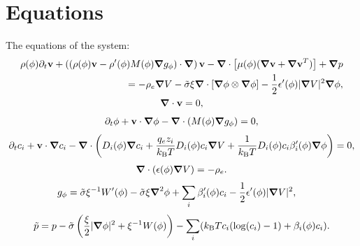 \documentclass[a4paper,10pt]{article}
\renewcommand{\v}[1]{\mathbf{#1}}
\renewcommand{\v}[1]{\ensuremath{\mathbf{#1}}} %
\newcommand{\gv}[1]{\ensuremath{\mbox{\boldmath$ #1 $}}}
\newcommand{\grad}[1]{\gv{\nabla} #1} %
\renewcommand{\div}[1]{\gv{\nabla} \cdot #1} %
\newcommand{\laplacian}[1]{\grad^2 #1}
\newcommand{\pdt}[1]{\partial_t #1}
\begin{document}
\section{Equations}
The equations of the system:
\begin{gather}
\begin{split}
\rho(\phi) \pdt \v v + \left( \left(\rho(\phi) \v v - \rho'(\phi) M(\phi) \grad g_\phi  \right) \cdot \grad \right) \v v - \div \left[  \mu(\phi)(\grad \v v + \grad \v v ^T) \right] + \grad p \\
= - \rho_e \grad V - \tilde \sigma \xi\div \left[ \grad \phi \otimes \grad \phi \right] - \frac 1 2 \epsilon'(\phi) | \grad V |^2 \grad \phi,
\end{split}\\
\div \v v = 0, 
\end{gather}
\begin{gather}
\pdt \phi + \v v \cdot \grad \phi - \div(M(\phi) \grad g_\phi ) = 0,
\end{gather}
\begin{gather}
\pdt c_i + \v v \cdot \grad c_i - \div \left( D_{i} (\phi) \grad c_i + \frac{ q_e  z_i}{k_{\rm B} T} D_i(\phi) c_i \grad V +\frac{1}{k_{\rm B} T} D_i(\phi)c_i\beta_i'(\phi) \grad \phi \right) = 0, 
\end{gather}
\begin{gather}
\div ( \epsilon (\phi) \grad V ) = - \rho_e.
\end{gather}
\begin{align}
g_\phi &= \tilde\sigma\xi^{-1}W'(\phi) - \tilde\sigma\xi\laplacian\phi + \sum_i \beta_i'(\phi) c_i - \frac{1}{2} \epsilon'(\phi) | \grad V |^2 ,
\end{align}
\begin{equation}
\tilde p = p - \tilde \sigma \left( \frac{\xi}{2} |\grad \phi|^2 + \xi^{-1} W(\phi) \right) - \sum_i ( k_{\mathrm{B}} T c_i(\log(c_i) -1) + \beta_i(\phi) c_i ) .
\end{equation}
\end{document}
